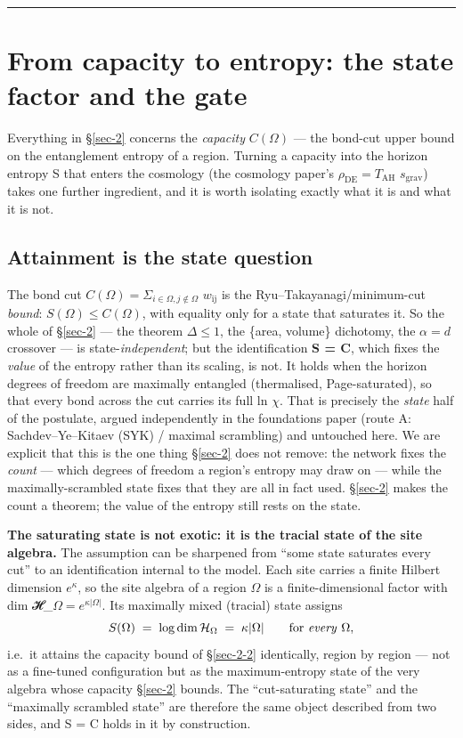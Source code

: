 \documentclass[12pt]{iopart}
\begin{document}
\begin{center}\rule{0.5\linewidth}{0.5pt}\end{center}

\section{From capacity to entropy: the state factor and the
gate}\label{sec-6}

Everything in §\ref{sec-2} concerns the \emph{capacity} \(C(\Omega )\)
--- the bond-cut upper bound on the entanglement entropy of a region.
Turning a capacity into the horizon entropy S that enters the cosmology
(the cosmology paper's \(\rho _\mathrm{DE} = T_\mathrm{AH}\)
\(s_{\mathrm{grav}}\)) takes one further ingredient, and it is worth
isolating exactly what it is and what it is not.

\subsection{Attainment is the state question}\label{sec-6-1}

The bond cut \(C(\Omega ) = \Sigma _{i\in \Omega , j\notin \Omega }\)
\(w_{\mathrm{ij}}\) is the Ryu--Takayanagi/minimum-cut \emph{bound}:
\(S(\Omega ) \leq  C(\Omega )\), with equality only for a state that
saturates it. So the whole of §\ref{sec-2} --- the theorem
\(\Delta  \leq  1\), the \{area, volume\} dichotomy, the \(\alpha  = d\)
crossover --- is state-\emph{independent}; but the identification
\textbf{S = C}, which fixes the \emph{value} of the entropy rather than
its scaling, is not. It holds when the horizon degrees of freedom are
maximally entangled (thermalised, Page-saturated), so that every bond
across the cut carries its full ln \(\chi\). That is precisely the
\emph{state} half of the postulate, argued independently in the
foundations paper (route A: Sachdev--Ye--Kitaev (SYK) / maximal
scrambling) and untouched here. We are explicit that this is the one
thing §\ref{sec-2} does not remove: the network fixes the \emph{count}
--- which degrees of freedom a region's entropy may draw on --- while
the maximally-scrambled state fixes that they are all in fact used.
§\ref{sec-2} makes the count a theorem; the value of the entropy still
rests on the state.

\textbf{The saturating state is not exotic: it is the tracial state of
the site algebra.} The assumption can be sharpened from ``some state
saturates every cut'' to an identification internal to the model. Each
site carries a finite Hilbert dimension \(e^{\kappa }\), so the site
algebra of a region \(\Omega\) is a finite-dimensional factor with dim
𝓗\_\(\Omega  = e^{\kappa |\Omega |}\). Its maximally mixed (tracial)
state assigns
\[S(\Omega) \;=\; \log \dim \mathcal{H}_\Omega \;=\; \kappa|\Omega| \qquad \text{for \emph{every} } \Omega,\]
i.e.~it attains the capacity bound of §\ref{sec-2-2} identically, region
by region --- not as a fine-tuned configuration but as the
maximum-entropy state of the very algebra whose capacity §\ref{sec-2}
bounds. The ``cut-saturating state'' and the ``maximally scrambled
state'' are therefore the same object described from two sides, and S =
C holds in it by construction.
\end{document}
